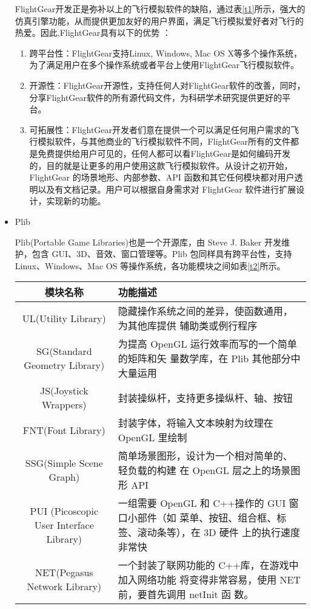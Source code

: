 \begin{itemize}
FlightGear开发正是弥补以上的飞行模拟软件的缺陷，通过表\ref{t1}所示，强大的仿真引擎功能，从而提供更加友好的用户界面，满足飞行模拟爱好者对飞行的热爱。因此,FlightGear具有以下的优势 ：
\begin{enumerate}
  \item 跨平台性：FlightGear支持Linux, Windows, Mac OS X等多个操作系统，为了满足用户在多个操作系统或者平台上使用FlightGear飞行模拟软件。
  \item 开源性：FlightGear开源性，支持任何人对FlightGear软件的改善，同时，分享FlightGear软件的所有源代码文件，为科研学术研究提供更好的平台。
  \item 可拓展性：FlightGear开发者们意在提供一个可以满足任何用户需求的飞行模拟软件，与其他商业的飞行模拟软件不同，FlightGear所有的文件都是免费提供给用户可见的，任何人都可以看FlightGear是如何编码开发的，目的就是让更多的用户使用这款飞行模拟软件。从设计之初开始，FlightGear 的场景地形、内部参数、API 函数和其它任何模块都对用户透明以及有文档记录。用户可以根据自身需求对 FlightGear 软件进行扩展设计，实现新的功能。
\end{enumerate}
  \item Plib

  Plib(Portable Game Libraries)也是一个开源库，由 Steve J. Baker 开发维护，包含 GUI、3D、音效、窗口管理等。Plib 包同样具有跨平台性，支持 Linux、Windows、Mac OS 等操作系统，各功能模块之间如表\ref{t2}所示。
  \vspace{-10pt}
  \begin{table}[h]
\begin{center}
\caption{Plib功能模块介绍}\label{t2}
\begin{longtable}{ | c| p{5cm}|}
\hline
模块名称                                    & 功能描述                                                                   \\\hline
UL(Utility Library)                     & 隐藏操作系统之间的差异，使函数通用，为其他库提供
辅助类或例行程序                                     \\\hline
SG(Standard Geometry Library)           & 为提高 OpenGL 运行效率而写的一个简单的矩阵和矢
量数学库，在 Plib 其他部分中大量运用
                                       \\\hline
JS(Joystick Wrappers)                   & 封装操纵杆，支持更多操纵杆、轴、按钮
                                                    \\\hline
FNT(Font Library)                       & 封装字体，将输入文本映射为纹理在 OpenGL 里绘制                                          \\\hline
SSG(Simple Scene Graph)                 & 简单场景图形，设计为一个相对简单的、轻负载的构建
在 OpenGL 层之上的场景图形 API
                         \\\hline
PUI (Picoscopic User Interface Library) &  一组需要 OpenGL 和 C++操作的 GUI 窗口小部件（如
菜单、按钮、组合框、标签、滚动条等），在 3D 硬件
上的执行速度非常快
 \\\hline
NET(Pegasus Network Library)            & 一个封装了联网功能的 C++库，在游戏中加入网络功能
将变得非常容易，使用 NET 前，要首先调用 netInit 函
数。


\end{longtable}
\end{center}
\end{table}
\end{itemize}
